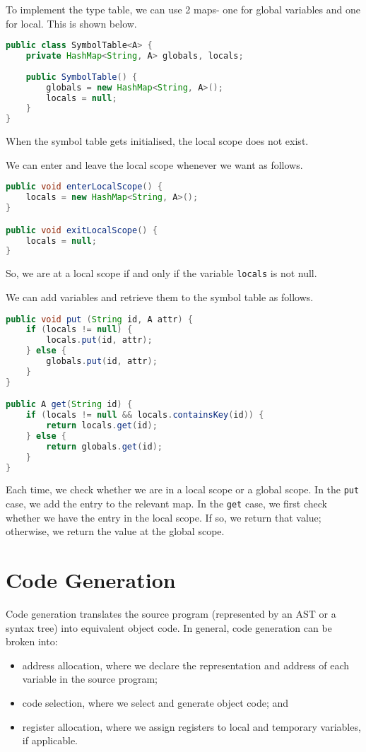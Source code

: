 \documentclass[a4paper, openany]{memoir}
\begin{document}
To implement the type table, we can use 2 maps- one for global variables and one for local. This is shown below.
\begin{lstlisting}[language=java]
public class SymbolTable<A> {
    private HashMap<String, A> globals, locals;
    
    public SymbolTable() {
        globals = new HashMap<String, A>();
        locals = null;
    }
}
\end{lstlisting}
When the symbol table gets initialised, the local scope does not exist.

We can enter and leave the local scope whenever we want as follows.
\begin{lstlisting}[language=java]
public void enterLocalScope() {
    locals = new HashMap<String, A>();
}

public void exitLocalScope() {
    locals = null;
}
\end{lstlisting}
So, we are at a local scope if and only if the variable \texttt{locals} is not null.

We can add variables and retrieve them to the symbol table as follows.
\begin{lstlisting}[language=java]
public void put (String id, A attr) {
    if (locals != null) {
        locals.put(id, attr);
    } else {
        globals.put(id, attr);
    }
}

public A get(String id) {
    if (locals != null && locals.containsKey(id)) {
        return locals.get(id);
    } else {
        return globals.get(id);
    }
}
\end{lstlisting}
Each time, we check whether we are in a local scope or a global scope. In the \texttt{put} case, we add the entry to the relevant map. In the \texttt{get} case, we first check whether we have the entry in the local scope. If so, we return that value; otherwise, we return the value at the global scope.

\newpage

\section{Code Generation}
Code generation translates the source program (represented by an AST or a syntax tree) into equivalent object code. In general, code generation can be broken into:
\begin{itemize}
    \item address allocation, where we declare the representation and address of each variable in the source program;
    \item code selection, where we select and generate object code; and
    \item register allocation, where we assign registers to local and temporary variables, if applicable.
\end{itemize}
\end{document}
